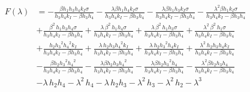 \begin{equation}
\label{xtics}
\begin{aligned}
F(\lambda) &= -\frac{\beta {h_1} {h_3} {h_4} {k_I} \sigma}{{h_3} {h_4} {k_I}-\beta {h_3} {h_4}}-\frac{\lambda \beta {h_1} {h_4} {k_I} \sigma}{{h_3} {h_4} {k_I}-\beta {h_3} {h_4}}-\frac{\lambda \beta {h_1} {h_3} {k_I} \sigma}{{h_3} {h_4} {k_I}-\beta {h_3} {h_4}}-\frac{{{\lambda}^{2}} \beta {h_1} {k_I} \sigma}{{h_3} {h_4} {k_I}-\beta {h_3} {h_4}}\\ \quad&+\frac{{{\beta}^{2}}\, {h_1} {h_3} {h_4} \sigma}{{h_3} {h_4} {k_I}-\beta {h_3} {h_4}}+\frac{\lambda\, {{\beta}^{2}}\, {h_1} {h_4} \sigma}{{h_3} {h_4} {k_I}-\beta {h_3} {h_4}}+\frac{\lambda\, {{\beta}^{2}}\, {h_1} {h_3} \sigma}{{h_3} {h_4} {k_I}-\beta {h_3} {h_4}}+\frac{{{\lambda}^{2}}\, {{\beta}^{2}}\, {h_1} \sigma}{{h_3} {h_4} {k_I}-\beta {h_3} {h_4}}\\ \quad &+\frac{{h_2} {{{h_3}}^{2}} {{{h_4}}^{2}} {k_I}}{{h_3} {h_4} {k_I}-\beta {h_3} {h_4}}+\frac{\lambda\, {h_2} {h_3} {{{h_4}}^{2}} {k_I}}{{h_3} {h_4} {k_I}-\beta {h_3} {h_4}}+\frac{\lambda\, {h_2} {{{h_3}}^{2}} {h_4} {k_I}}{{h_3} {h_4} {k_I}-\beta {h_3} {h_4}}+\frac{{{\lambda}^{2}}\, {h_2} {h_3} {h_4} {k_I}}{{h_3} {h_4} {k_I}-\beta {h_3} {h_4}}\\ \quad&-\frac{\beta {h_2} {{{h_3}}^{2}} {{{h_4}}^{2}}}{{h_3} {h_4} {k_I}-\beta {h_3} {h_4}}-\frac{\lambda \beta {h_2} {h_3} {{{h_4}}^{2}}}{{h_3} {h_4} {k_I}-\beta {h_3} {h_4}}-\frac{\lambda \beta {h_2} {{{h_3}}^{2}} {h_4}}{{h_3} {h_4} {k_I}-\beta {h_3} {h_4}}-\frac{{{\lambda}^{2}} \beta {h_2} {h_3} {h_4}}{{h_3} {h_4} {k_I}-\beta {h_3} {h_4}}\\ \quad&-\lambda\, {h_2} {h_4}-{{\lambda}^{2}}\, {h_4}-\lambda\, {h_2} {h_3}-{{\lambda}^{2}}\, {h_3}-{{\lambda}^{2}}\, {h_2}-{{\lambda}^{3}} 
\end{aligned}
\end{equation}

